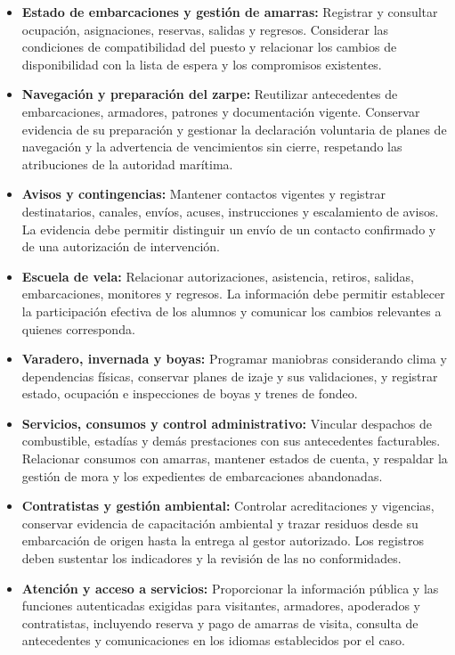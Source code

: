 \begin{itemize}
    \item \textbf{Estado de embarcaciones y gestión de amarras:} Registrar y consultar ocupación, asignaciones, reservas, salidas y regresos. Considerar las condiciones de compatibilidad del puesto y relacionar los cambios de disponibilidad con la lista de espera y los compromisos existentes.
    \item \textbf{Navegación y preparación del zarpe:} Reutilizar antecedentes de embarcaciones, armadores, patrones y documentación vigente. Conservar evidencia de su preparación y gestionar la declaración voluntaria de planes de navegación y la advertencia de vencimientos sin cierre, respetando las atribuciones de la autoridad marítima.
    \item \textbf{Avisos y contingencias:} Mantener contactos vigentes y registrar destinatarios, canales, envíos, acuses, instrucciones y escalamiento de avisos. La evidencia debe permitir distinguir un envío de un contacto confirmado y de una autorización de intervención.
    \item \textbf{Escuela de vela:} Relacionar autorizaciones, asistencia, retiros, salidas, embarcaciones, monitores y regresos. La información debe permitir establecer la participación efectiva de los alumnos y comunicar los cambios relevantes a quienes corresponda.
    \item \textbf{Varadero, invernada y boyas:} Programar maniobras considerando clima y dependencias físicas, conservar planes de izaje y sus validaciones, y registrar estado, ocupación e inspecciones de boyas y trenes de fondeo.
    \item \textbf{Servicios, consumos y control administrativo:} Vincular despachos de combustible, estadías y demás prestaciones con sus antecedentes facturables. Relacionar consumos con amarras, mantener estados de cuenta, y respaldar la gestión de mora y los expedientes de embarcaciones abandonadas.
    \item \textbf{Contratistas y gestión ambiental:} Controlar acreditaciones y vigencias, conservar evidencia de capacitación ambiental y trazar residuos desde su embarcación de origen hasta la entrega al gestor autorizado. Los registros deben sustentar los indicadores y la revisión de las no conformidades.
    \item \textbf{Atención y acceso a servicios:} Proporcionar la información pública y las funciones autenticadas exigidas para visitantes, armadores, apoderados y contratistas, incluyendo reserva y pago de amarras de visita, consulta de antecedentes y comunicaciones en los idiomas establecidos por el caso.
\end{itemize}


